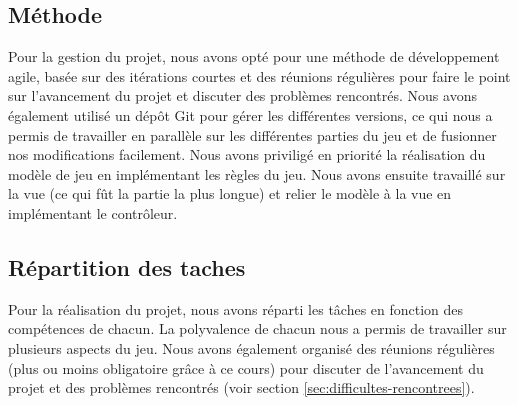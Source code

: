 \documentclass{article}
\begin{document}
    \subsection{Méthode}\label{subsec:methode}

    Pour la gestion du projet, nous avons opté pour une méthode de développement agile, basée sur des itérations courtes et des réunions régulières pour faire le point sur l'avancement du projet et discuter des problèmes rencontrés.
    Nous avons également utilisé un dépôt Git pour gérer les différentes versions, ce qui nous a permis de travailler en parallèle sur les différentes parties du jeu et de fusionner nos modifications facilement.
    Nous avons priviligé en priorité la réalisation du modèle de jeu en implémentant les règles du jeu.
    Nous avons ensuite travaillé sur la vue (ce qui fût la partie la plus longue) et relier le modèle à la vue en implémentant le contrôleur.

    \subsection{Répartition des taches}\label{subsec:repartition-des-taches}
    Pour la réalisation du projet, nous avons réparti les tâches en fonction des compétences de chacun.
    La polyvalence de chacun nous a permis de travailler sur plusieurs aspects du jeu.
    Nous avons également organisé des réunions régulières (plus ou moins obligatoire grâce à ce cours) pour discuter de l'avancement du projet et des problèmes rencontrés (voir section \ref{sec:difficultes-rencontrees}).
\end{document}

